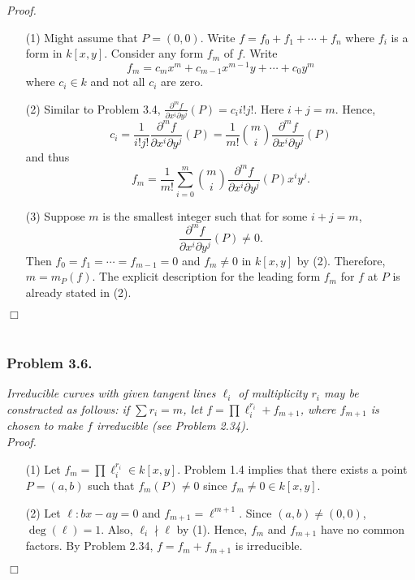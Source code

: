 \documentclass{article}
\begin{document}
\emph{Proof.}
\begin{enumerate}
\item[(1)]
  Might assume that $P = (0,0)$.
  Write $f = f_0 + f_1 + \cdots + f_n$ where $f_i$ is a form in $k[x,y]$.
  Consider any form $f_m$ of $f$.
  Write
  \[
    f_m = c_{m} x^m + c_{m-1} x^{m-1} y + \cdots + c_{0} y^m
  \]
  where $c_i \in k$ and not all $c_i$ are zero.

\item[(2)]
  Similar to Problem 3.4,
  $\frac{\partial^{m} f}{\partial x^i \partial y^j}(P) = c_i i!j!$.
  Here $i+j = m$.
  Hence,
  \[
    c_i
    = \frac{1}{i!j!} \frac{\partial^{m} f}{\partial x^i \partial y^j}(P)
    = \frac{1}{m!} {m \choose i} \frac{\partial^{m} f}{\partial x^i \partial y^j}(P)
  \]
  and thus
  \[
    f_m
    = \frac{1}{m!} \sum_{i = 0}^{m}
    {m \choose i} \frac{\partial^{m} f}{\partial x^i \partial y^j}(P) x^i y^j.
  \]

\item[(3)]
  Suppose $m$ is the smallest integer such that
  for some $i + j = m$,
  \[
    \frac{\partial^{m} f}{\partial x^i \partial y^j}(P) \neq 0.
  \]
  Then $f_0 = f_1 = \cdots = f_{m-1} = 0$ and $f_m \neq 0$ in $k[x,y]$ by (2).
  Therefore, $m = m_P(f)$.
  The explicit description for the leading form $f_m$ for $f$ at $P$
  is already stated in (2).
\end{enumerate}
$\Box$ \\\\






\subsubsection*{Problem 3.6.}
\emph{Irreducible curves with given tangent lines $\ell_i$ of multiplicity $r_i$
may be constructed as follows: if $\sum r_i = m$, let
$f = \prod \ell_i^{r_i} + f_{m+1}$,
where $f_{m+1}$ is chosen to make $f$ irreducible (see Problem 2.34).} \\



\emph{Proof.}
\begin{enumerate}
\item[(1)]
  Let $f_m = \prod \ell_i^{r_i} \in k[x,y]$.
  Problem 1.4 implies that there exists a point $P = (a,b)$ such that
  $f_m(P) \neq 0$ since $f_m \neq 0 \in k[x,y]$.

\item[(2)]
  Let $\ell: bx - ay = 0$ and $f_{m+1} = \ell^{m+1}$.
  Since $(a,b) \neq (0,0)$, $\deg(\ell) = 1$.
  Also, $\ell_i \nmid \ell$ by (1).
  Hence, $f_m$ and $f_{m+1}$ have no common factors.
  By Problem 2.34, $f = f_{m} + f_{m+1}$ is irreducible.
\end{enumerate}
$\Box$ \\\\
\end{document}
